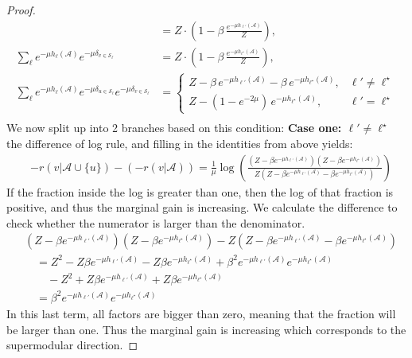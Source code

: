 \documentclass{article}
\def \setA{\mathcal{A}}
\def \setS{\mathcal{S}}
\begin{document}
\begin{proof}
\begin{equation}
\begin{aligned}
	&= Z\cdot\left(1 - \beta\, \tfrac{e^{-\mu h_{\ell'}(\setA)}}{Z}\right), \\
	\sum_{\ell} e^{-\mu h_\ell(\setA)} e^{-\mu \delta_{v \in \setS_\ell}}
	&= Z \cdot \left(1 - \beta\, \tfrac{e^{-\mu h_{\ell^\star}(\setA)}}{Z}\right), \\
	\sum_{\ell} e^{-\mu h_\ell(\setA)} e^{-\mu \delta_{u \in \setS_\ell}} e^{-\mu \delta_{v \in \setS_{\ell}}}
	&=\begin{cases}
	    Z - \beta\, e^{-\mu h_{\ell'}(\setA)} - \beta\, e^{-\mu h_{\ell^\star}(\setA)}, & \ell'  \not= \ell^\star\\
        	Z - (1-e^{-2\mu})\, e^{-\mu h_{\ell^\star}(\setA)},  & \ell'  = \ell^\star
	\end{cases}  \\
\end{aligned}
\end{equation}
    We now split up into 2 branches based on this condition:
    \newline \newline \noindent
    \textbf{Case one: $\ell' \not= \ell^\star$}\\
    the difference of log rule, and filling in the identities from above yields:
    \begin{align}
        &-r(v|\setA\cup \{u\}) - (-r(v|\setA)) =\frac{1}{\mu}\log\left( \frac{(Z-\beta e^{-\mu h_{\ell'}(\setA)})(Z-\beta e^{-\mu h_{\ell^\star}(\setA)})}{Z(Z-\beta e^{-\mu h_{\ell'}(\setA)}-\beta e^{-\mu h_{\ell^\star}(\setA)})}
        \right)
    \end{align}
If the fraction inside the log is greater than one, then the log of that fraction is positive, and thus the marginal gain is increasing. We calculate the difference to check whether the numerator is larger than the denominator.
\begin{align*}
        &(Z-\beta e^{-\mu h_{\ell'}(\setA)})(Z-\beta e^{-\mu h_{\ell^\star}(\setA)})-Z(Z-\beta e^{-\mu h_{\ell'}(\setA)}-\beta e^{-\mu h_{\ell^\star}(\setA)})\\
        &\quad = Z^2-Z\beta e^{-\mu h_{\ell'}(\setA)}-Z\beta e^{-\mu h_{\ell^\star}(\setA)}+\beta^2e^{-\mu h_{\ell'}(\setA)} e^{-\mu h_{\ell^\star}(\setA)}\\
        &\qquad -Z^2+Z\beta e^{-\mu h_{\ell'}(\setA)}+Z\beta e^{-\mu h_{\ell^\star}(\setA)}\\
        &\quad = \beta^2e^{-\mu h_{\ell'}(\setA)} e^{-\mu h_{\ell^\star}(\setA)}
    \end{align*}
    In this last term, all factors are bigger than zero, meaning that the fraction will be larger than one. Thus the marginal gain is increasing which corresponds to the supermodular direction. \newline \newline \noindent

\end{proof}
\end{document}
